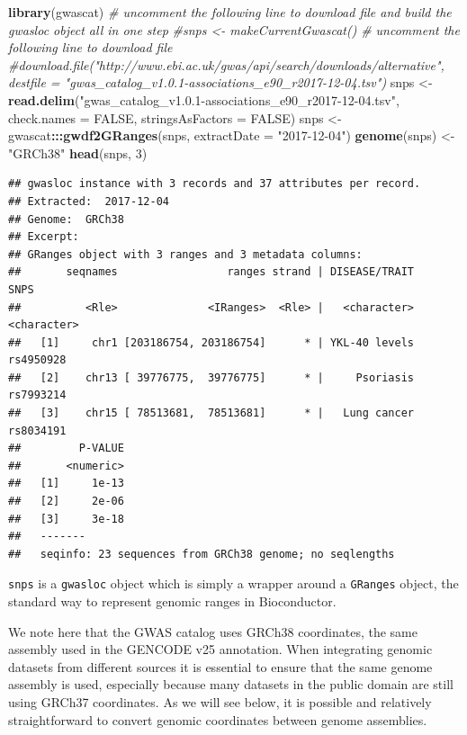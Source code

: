 \documentclass[9pt,a4paper,]{extarticle}
\newenvironment{Shaded}{\begin{snugshade}}{\end{snugshade}}
\newcommand{\KeywordTok}[1]{\textcolor[rgb]{0.13,0.29,0.53}{\textbf{#1}}}
\newcommand{\DataTypeTok}[1]{\textcolor[rgb]{0.13,0.29,0.53}{#1}}
\newcommand{\DecValTok}[1]{\textcolor[rgb]{0.00,0.00,0.81}{#1}}
\newcommand{\StringTok}[1]{\textcolor[rgb]{0.31,0.60,0.02}{#1}}
\newcommand{\CommentTok}[1]{\textcolor[rgb]{0.56,0.35,0.01}{\textit{#1}}}
\newcommand{\OtherTok}[1]{\textcolor[rgb]{0.56,0.35,0.01}{#1}}
\newcommand{\OperatorTok}[1]{\textcolor[rgb]{0.81,0.36,0.00}{\textbf{#1}}}
\newcommand{\NormalTok}[1]{#1}
\theoremstyle{definition}
\theoremstyle{definition}
\theoremstyle{definition}
\theoremstyle{remark}
\begin{document}
\begin{Shaded}
\begin{Highlighting}[]
\KeywordTok{library}\NormalTok{(gwascat)}
\CommentTok{# uncomment the following line to download file and build the gwasloc object all in one step}
\CommentTok{#snps <- makeCurrentGwascat()}
\CommentTok{# uncomment the following line to download file}
\CommentTok{#download.file("http://www.ebi.ac.uk/gwas/api/search/downloads/alternative", destfile = "gwas_catalog_v1.0.1-associations_e90_r2017-12-04.tsv")}
\NormalTok{snps <-}\StringTok{ }\KeywordTok{read.delim}\NormalTok{(}\StringTok{"gwas_catalog_v1.0.1-associations_e90_r2017-12-04.tsv"}\NormalTok{, }\DataTypeTok{check.names =} \OtherTok{FALSE}\NormalTok{, }\DataTypeTok{stringsAsFactors =} \OtherTok{FALSE}\NormalTok{)}
\NormalTok{snps <-}\StringTok{ }\NormalTok{gwascat}\OperatorTok{:::}\KeywordTok{gwdf2GRanges}\NormalTok{(snps, }\DataTypeTok{extractDate =} \StringTok{"2017-12-04"}\NormalTok{)}
\KeywordTok{genome}\NormalTok{(snps) <-}\StringTok{ "GRCh38"}
\KeywordTok{head}\NormalTok{(snps, }\DecValTok{3}\NormalTok{)}
\end{Highlighting}
\end{Shaded}

\begin{verbatim}
## gwasloc instance with 3 records and 37 attributes per record.
## Extracted:  2017-12-04 
## Genome:  GRCh38 
## Excerpt:
## GRanges object with 3 ranges and 3 metadata columns:
##       seqnames                 ranges strand | DISEASE/TRAIT        SNPS
##          <Rle>              <IRanges>  <Rle> |   <character> <character>
##   [1]     chr1 [203186754, 203186754]      * | YKL-40 levels   rs4950928
##   [2]    chr13 [ 39776775,  39776775]      * |     Psoriasis   rs7993214
##   [3]    chr15 [ 78513681,  78513681]      * |   Lung cancer   rs8034191
##         P-VALUE
##       <numeric>
##   [1]     1e-13
##   [2]     2e-06
##   [3]     3e-18
##   -------
##   seqinfo: 23 sequences from GRCh38 genome; no seqlengths
\end{verbatim}

\texttt{snps} is a \texttt{gwasloc} object which is simply a wrapper around a \texttt{GRanges} object, the standard way to represent genomic ranges in Bioconductor.

We note here that the GWAS catalog uses GRCh38 coordinates, the same assembly used in the GENCODE v25 annotation.
When integrating genomic datasets from different sources it is essential to ensure that the same genome assembly is used, especially because many datasets in the public domain are still using GRCh37 coordinates.
As we will see below, it is possible and relatively straightforward to convert genomic coordinates between genome assemblies.
\end{document}
